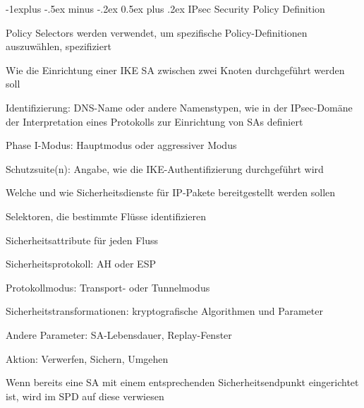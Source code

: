 \documentclass[a4paper]{article}
\makeatletter
\renewcommand{\subsection}{\@startsection{subsection}{2}{0mm}%
 {-1explus -.5ex minus -.2ex}%
 {0.5ex plus .2ex}%
 {\normalfont\normalsize\bfseries}}
\makeatother
\begin{document}
\begin{multicols}{3}
      \subsection{IPsec Security Policy Definition}
      \begin{itemize*}
            \item Policy Selectors werden verwendet, um spezifische Policy-Definitionen auszuwählen, spezifiziert
            \item Wie die Einrichtung einer IKE SA zwischen zwei Knoten durchgeführt werden soll
            \begin{itemize*}
                  \item Identifizierung: DNS-Name oder andere Namenstypen, wie in der IPsec-Domäne der Interpretation eines Protokolls zur Einrichtung von SAs definiert
                  \item Phase I-Modus: Hauptmodus oder aggressiver Modus
                  \item Schutzsuite(n): Angabe, wie die IKE-Authentifizierung durchgeführt wird
            \end{itemize*}
            \item Welche und wie Sicherheitsdienste für IP-Pakete bereitgestellt werden sollen
            \begin{itemize*}
                  \item Selektoren, die bestimmte Flüsse identifizieren
                  \item Sicherheitsattribute für jeden Fluss
                  \item Sicherheitsprotokoll: AH oder ESP
                  \item Protokollmodus: Transport- oder Tunnelmodus
                  \item Sicherheitstransformationen: kryptografische Algorithmen und Parameter
                  \item Andere Parameter: SA-Lebensdauer, Replay-Fenster
                  \item Aktion: Verwerfen, Sichern, Umgehen
            \end{itemize*}
            \item Wenn bereits eine SA mit einem entsprechenden Sicherheitsendpunkt eingerichtet ist, wird im SPD auf diese verwiesen
      \end{itemize*}


\end{multicols}
\end{document}
